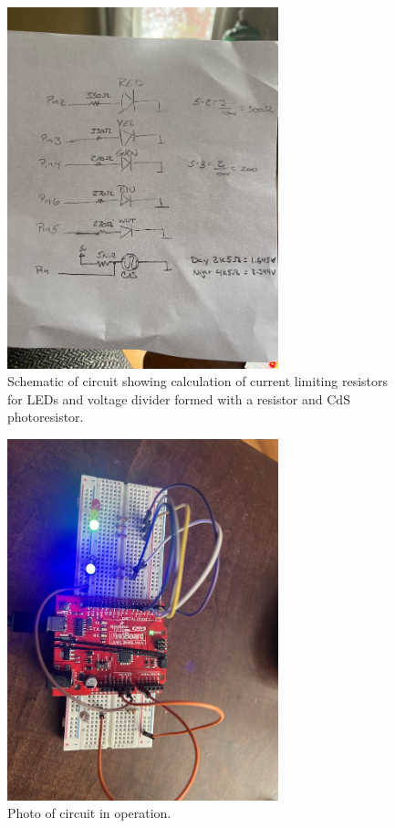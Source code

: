 \documentclass{article}
\begin{document}
	\begin{figure}[H]
	    \centering
	    \includegraphics[width=0.7\textwidth]{schematic}
	    \caption{Schematic of circuit showing calculation of current limiting resistors for LEDs and voltage divider formed with a resistor and CdS photoresistor.}
	\end{figure}

	\begin{figure}[H]
	    \centering
	    \includegraphics[width=0.7\textwidth]{circuit}
	    \caption{Photo of circuit in operation.}
	\end{figure}
\end{document}

